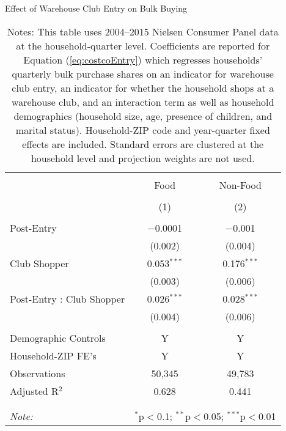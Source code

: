 
\begin{table}[!htbp] \centering
  \caption{Effect of Warehouse Club Entry on Bulk Buying}
  \label{tab:costcoEntry}
\begin{tabular}{@{\extracolsep{5pt}}lcc}
\\[-1.8ex]\hline
\hline \\[-1.8ex]
 & Food & Non-Food \\
\\[-1.8ex] & (1) & (2)\\
\hline \\[-1.8ex]
 Post-Entry & $-$0.0001 & $-$0.001 \\
  & (0.002) & (0.004) \\
  Club Shopper & 0.053$^{***}$ & 0.176$^{***}$ \\
  & (0.003) & (0.006) \\
  Post-Entry : Club Shopper & 0.026$^{***}$ & 0.028$^{***}$ \\
  & (0.004) & (0.006) \\
 \hline \\[-1.8ex]
Demographic Controls & Y & Y \\
Household-ZIP FE's & Y & Y \\
Observations & 50,345 & 49,783 \\
Adjusted R$^{2}$ & 0.628 & 0.441 \\
\\[-1.8ex]\hline
\hline \\[-1.8ex]
\textit{Note:}  & \multicolumn{2}{l}{$^{*}$p$<$0.1; $^{**}$p$<$0.05; $^{***}$p$<$0.01} \\
\end{tabular}
\caption*{Notes: This table uses 2004--2015 Nielsen Consumer Panel data at the household-quarter level. Coefficients are reported for Equation (\ref{eq:costcoEntry}) which regresses households' quarterly bulk purchase shares on an indicator for warehouse club entry, an indicator for whether the household shops at a warehouse club, and an interaction term as well as household demographics (household size, age, presence of children, and marital status). Household-ZIP code and year-quarter fixed effects are included. Standard errors are clustered at the household level and projection weights are not used.}
\end{table}
